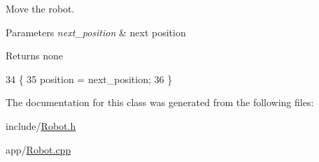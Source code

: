 Move the robot. 


\begin{DoxyParams}{Parameters}
{\em next\+\_\+position} & next position \\
\hline
\end{DoxyParams}
\begin{DoxyReturn}{Returns}
none 
\end{DoxyReturn}

\begin{DoxyCode}
34                                                        \{
35     position = next\_position;
36 \}
\end{DoxyCode}


The documentation for this class was generated from the following files\+:\begin{DoxyCompactItemize}
\item 
include/\hyperlink{Robot_8h}{Robot.\+h}\item 
app/\hyperlink{Robot_8cpp}{Robot.\+cpp}\end{DoxyCompactItemize}
